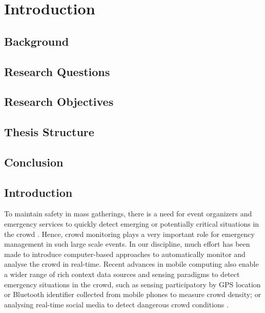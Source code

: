\chapter{Introduction}  %

\ifpdf
    \graphicspath{{Chapter1/Figs/Raster/}{Chapter1/Figs/PDF/}{Chapter1/Figs/}}
\else
    \graphicspath{{Chapter1/Figs/Vector/}{Chapter1/Figs/}}
\fi


\section{Background}

\section{Research Questions}

\section{Research Objectives}

\section{Thesis Structure}

\section{Conclusion}

\section{Introduction}

To maintain safety in mass gatherings, there is a need for event organizers and emergency services to quickly detect emerging or potentially critical situations in the crowd \citep{Wirz2012} . Hence, crowd monitoring plays a very important role for emergency management in such large scale events. In our discipline, much effort has been made to introduce computer-based approaches to automatically monitor and analyse the crowd in real-time. Recent advances in mobile computing also enable a wider range of rich context data sources and sensing paradigms to detect emergency situations in the crowd, such as sensing participatory by GPS location \citep{Wirz2012} or Bluetooth identifier \citep{Weppner2013} collected from mobile phones to measure crowd density; or analysing real-time social media to detect dangerous crowd conditions \citep{DelirHaghighi2013}.

